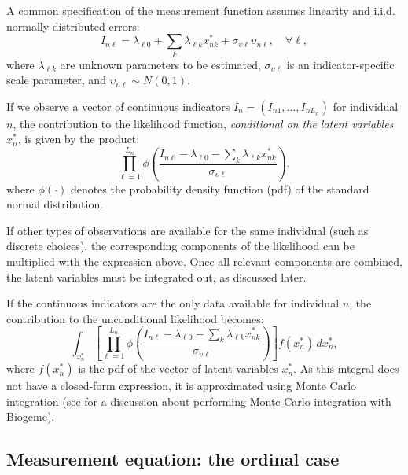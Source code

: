 \documentclass[12pt,a4paper]{article}
\begin{document}
A common specification of the measurement function assumes linearity
and i.i.d. normally distributed errors:
\begin{equation}
\label{eq:linearMeasurement}
I_{n\ell} = \lambda_{\ell 0} + \sum_k \lambda_{\ell k}  x_{nk}^* + \sigma_{\upsilon \ell} \upsilon_{n\ell}, \quad \forall \ell,
\end{equation}
where $\lambda_{\ell k}$ are unknown parameters to be estimated, $\sigma_{\upsilon \ell}$ is an indicator-specific scale parameter, and $\upsilon_{n\ell} \sim N(0, 1)$.

If we observe a vector of continuous indicators \( I_n = (I_{n1}, \ldots, I_{nL_n}) \) for individual \( n \), the contribution to the likelihood function, \emph{conditional on the latent variables} \( x^*_{n} \), is given by the product:
\begin{equation}
\prod_{\ell=1}^{L_n} \phi\left( \frac{I_{n\ell} - \lambda_{\ell 0} - \sum_k \lambda_{\ell k} x_{nk}^*}{\sigma_{\upsilon \ell}} \right),
\end{equation}
where \( \phi(\cdot) \) denotes the probability density function (pdf) of the standard normal distribution.

If other types of observations are available for the same individual (such as discrete choices), the corresponding components of the likelihood can be multiplied with the expression above. Once all relevant components are combined, the latent variables must be integrated out, as discussed later.

If the continuous indicators are the only data available for individual \( n \), the contribution to the unconditional likelihood becomes:
\begin{equation}
\int_{x_n^*} \left[ \prod_{\ell=1}^{L_n} \phi\left( \frac{I_{n\ell} - \lambda_{\ell 0} - \sum_k \lambda_{\ell k} x_{nk}^*}{\sigma_{\upsilon \ell}} \right) \right] f(x_n^*) \, dx_n^*,
\end{equation}
where \( f(x_n^*) \) is the pdf of the vector of latent variables \( x_n^* \).
As this integral does not have a closed-form expression, it is approximated using Monte Carlo integration (see \cite{Bier19} for a discussion about performing Monte-Carlo integration with Biogeme).




\subsection{Measurement equation: the ordinal case}
\label{sec:likert}
\end{document}
